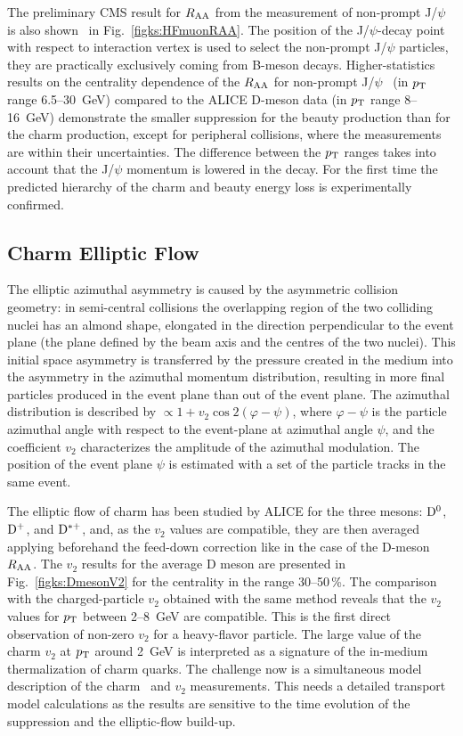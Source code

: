 The preliminary CMS result for $R_{\rm AA}$ from the measurement of non-prompt J/$\psi$ is also shown~\cite{Chatrchyan:2012np} in Fig.~\ref{figks:HFmuonRAA}. The position of the J/$\psi$-decay point with respect to interaction vertex is used to select the non-prompt J/$\psi$ particles, they are practically exclusively coming from B-meson decays. Higher-statistics results on the centrality dependence of the $R_{\rm AA}$ for non-prompt J/$\psi$~\cite{CMS:2012wba} (in $p_{\rm T}$ range 6.5--30~GeV) compared to the ALICE D-meson data (in $p_{\rm T}$ range 8--16~GeV) demonstrate the smaller suppression for the beauty production than for the charm production, except for peripheral collisions, where the measurements are within their uncertainties. The difference between the $p_{\rm T}$ ranges takes into account that the J/$\psi$ momentum is lowered in the decay. For the first time the predicted hierarchy of the charm and beauty energy loss is experimentally confirmed.

\subsection{Charm Elliptic Flow}
\label{subsecks:heavyflow}
The elliptic azimuthal asymmetry is caused by the asymmetric collision geometry: in semi-central collisions the overlapping region of the two colliding nuclei has an almond shape, elongated in the direction perpendicular to the event plane (the plane defined by the beam axis and the centres of the two nuclei). This initial space asymmetry is transferred by the pressure created in the medium into the asymmetry in the azimuthal momentum distribution, resulting in more final particles produced in the event plane than out of the event plane. The azimuthal distribution is described by $\propto 1 + v_2 \cos{2(\varphi - \psi)}$, where $\varphi - \psi$ is the particle azimuthal angle with respect to the event-plane at azimuthal angle $\psi$, and the coefficient $v_2$ characterizes the amplitude of the azimuthal modulation. The position of the event plane $\psi$ is estimated with a set of the particle tracks in the same event.

The elliptic flow of charm has been studied by ALICE for the three mesons: ${\rm D}^0$, ${\rm D}^+$, and ${\rm D}^{*+}$, and, as the $v_2$ values are compatible, they are then averaged applying beforehand the feed-down correction like in the case of the D-meson $R_{\rm AA}$. The $v_2$ results for the average D meson are presented in Fig.~\ref{figks:DmesonV2} for the centrality in the range 30--50\,\%. The comparison with the charged-particle $v_2$ obtained with the same method reveals that the $v_2$ values for $p_{\rm T}$ between 2--8~GeV are compatible. This is the first direct observation of non-zero $v_2$ for a heavy-flavor particle. The large value of the charm $v_2$ at $p_{\rm T}$ around 2~GeV is interpreted as a signature of the in-medium thermalization of charm quarks. The challenge now is a simultaneous model description of the charm \Raa\ and $v_2$ measurements. This needs a detailed transport model calculations as the results are sensitive to the time evolution of the suppression and the elliptic-flow build-up.

